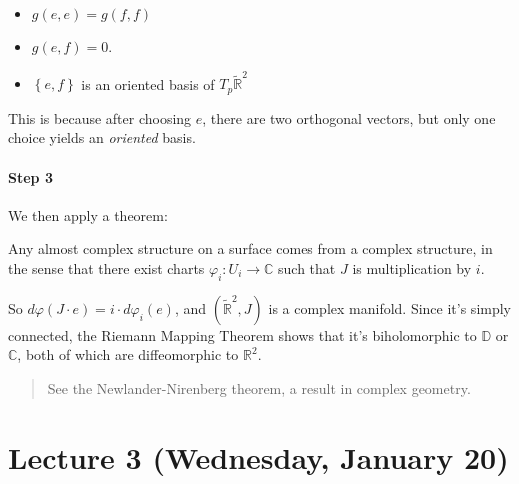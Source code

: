 \begin{itemize}
\tightlist
\item
  \(g(e, e) = g(f, f)\)
\item
  \(g(e, f) = 0\).
\item
  \(\left\{{e, f}\right\}\) is an oriented basis of
  \(T_p \tilde {\mathbb{R}}^2\)
\end{itemize}

This is because after choosing \(e\), there are two orthogonal vectors,
but only one choice yields an \emph{oriented} basis.

\begin{figure}
\centering
{}
\end{figure}

\hypertarget{step-3}{%
\paragraph{Step 3}\label{step-3}}

We then apply a theorem:

\begin{theorem}[?]

Any almost complex structure on a surface comes from a complex
structure, in the sense that there exist charts
\(\varphi_i: U_i \to {\mathbb{C}}\) such that \(J\) is multiplication by
\(i\).

\end{theorem}

So \(d \varphi(J \cdot e) = i \cdot d \varphi_i (e)\), and
\((\tilde {\mathbb{R}}^2, J)\) is a complex manifold. Since it's simply
connected, the Riemann Mapping Theorem shows that it's biholomorphic to
\({\mathbb{D}}\) or \({\mathbb{C}}\), both of which are diffeomorphic to
\({\mathbb{R}}^2\).

\begin{quote}
See the Newlander-Nirenberg theorem, a result in complex geometry.
\end{quote}

\hypertarget{lecture-3-wednesday-january-20}{%
\section{Lecture 3 (Wednesday, January
20)}\label{lecture-3-wednesday-january-20}}

